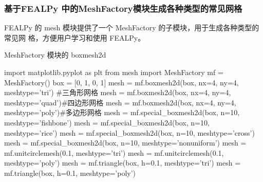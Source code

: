 \documentclass{beamer}
\numberwithin{subsection}{section}
\begin{document}
\begin{frame}[fragile]
		\frametitle{基于FEALPy 中的MeshFactory模块生成各种类型的常见网格}
    FEALPy 的 mesh 模块提供了一个 MeshFactory 的子模块，用于生成各种类型的常见网
    格，方便用户学习和使用 FEALPy。
		\begin{listing}[H]
		\scriptsize
		\caption{ MeshFactory 模块的 boxmesh2d}
        \begin{pythoncode}
import matplotlib.pyplot as plt
from mesh import MeshFactory
mf = MeshFactory()
box = [0, 1, 0, 1]
mesh = mf.boxmesh2d(box, nx=4, ny=4, meshtype='tri') #三角形网格
mesh = mf.boxmesh2d(box, nx=4, ny=4, meshtype='quad')#四边形网格
mesh = mf.boxmesh2d(box, nx=4, ny=4, meshtype='poly')#多边形网格 
mesh = mf.special_boxmesh2d(box, n=10, meshtype='fishbone')
mesh = mf.special_boxmesh2d(box, n=10, meshtype='rice')
mesh = mf.special_boxmesh2d(box, n=10, meshtype='cross')
mesh = mf.special_boxmesh2d(box, n=10, meshtype='nonuniform')
mesh = mf.unitcirclemesh(0.1, meshtype='tri')
mesh = mf.unitcirclemesh(0.1, meshtype='poly')
mesh = mf.triangle(box, h=0.1, meshtype='tri')
mesh = mf.triangle(box, h=0.1, meshtype='poly')
		\end{pythoncode}
		\end{listing}
\end{frame}
\end{document}
